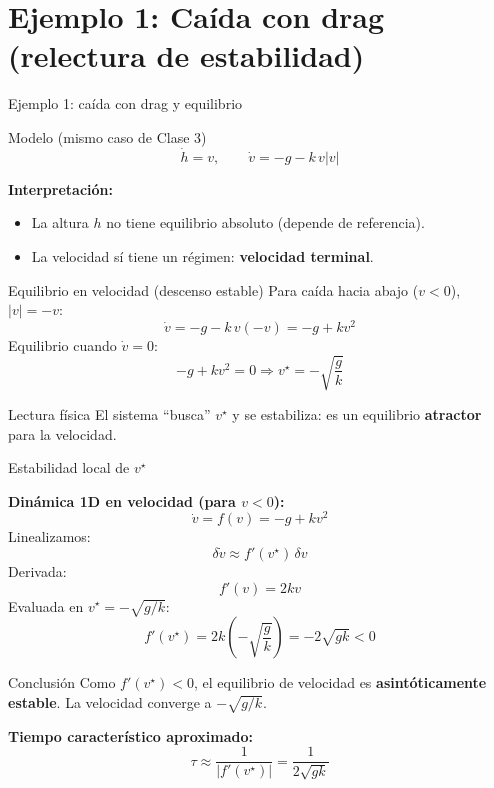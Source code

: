 \documentclass[aspectratio=169,10pt]{beamer}
\newcommand{\importantbox}[2][Importante]{%
\begin{alertblock}{#1}#2\end{alertblock}}
\begin{document}
\section{Ejemplo 1: Caída con drag (relectura de estabilidad)}

\begin{frame}{Ejemplo 1: caída con drag y equilibrio}
\small

\begin{block}{Modelo (mismo caso de Clase 3)}
\[
\dot{h}=v,\qquad \dot{v}=-g-k\,v|v|
\]
\end{block}

\textbf{Interpretación:}
\begin{itemize}
\item La altura $h$ no tiene equilibrio absoluto (depende de referencia).
\item La velocidad sí tiene un régimen: \textbf{velocidad terminal}.
\end{itemize}

\begin{block}{Equilibrio en velocidad (descenso estable)}
Para caída hacia abajo ($v<0$), $|v|=-v$:
\[
\dot{v}=-g-k\,v(-v)=-g+k v^2
\]
Equilibrio cuando $\dot{v}=0$:
\[
-g+k v^2=0 \Rightarrow v^\star = -\sqrt{\frac{g}{k}}
\]
\end{block}

\importantbox[Lectura física]{
El sistema ``busca'' $v^\star$ y se estabiliza: es un equilibrio \textbf{atractor} para la velocidad.
}

\end{frame}

\begin{frame}{Estabilidad local de $v^\star$}
\small

\textbf{Dinámica 1D en velocidad (para $v<0$):}
\[
\dot{v}=f(v)=-g+k v^2
\]
Linealizamos:
\[
\delta \dot{v} \approx f'(v^\star)\,\delta v
\]
Derivada:
\[
f'(v)=2kv
\]
Evaluada en $v^\star=-\sqrt{g/k}$:
\[
f'(v^\star)=2k\left(-\sqrt{\frac{g}{k}}\right)=-2\sqrt{gk}<0
\]

\importantbox[Conclusión]{
Como $f'(v^\star)<0$, el equilibrio de velocidad es \textbf{asintóticamente estable}.
La velocidad converge a $-\sqrt{g/k}$.
}

\vspace{2mm}
\textbf{Tiempo característico aproximado:}
\[
\tau \approx \frac{1}{|f'(v^\star)|}=\frac{1}{2\sqrt{gk}}
\]

\end{frame}
\end{document}
